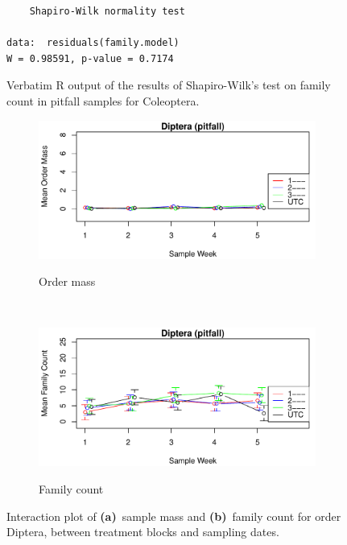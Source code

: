 \documentclass[10pt,letterpaper,twocolumn]{article}
\begin{document}
\begin{figure}[h]
	\lstset{numbers=left}
	\lstset{xleftmargin=5mm,framexleftmargin=5mm}
	\begin{lstlisting}
	Shapiro-Wilk normality test

data:  residuals(family.model)
W = 0.98591, p-value = 0.7174
	\end{lstlisting}
	\caption{Verbatim R output of the results of Shapiro-Wilk's test on family count in pitfall samples for Coleoptera.}
	\label{fig:pitfall_coleoptera_family_shapiro}
	\smallskip
	\nointerlineskip
	\hrulefill
\end{figure}

\begin{figure}[h]
	\centering
	\begin{subfigure}[b]{0.45\textwidth}
		\caption{Order mass}
		\includegraphics[width=\textwidth]{plots/blocks/interaction/mass/mass_pitfall_Diptera_interplot.pdf}
		\label{fig:pitfall_diptera_mass_interplot}
	\end{subfigure}
	~
	\begin{subfigure}[b]{0.45\textwidth}
		\caption{Family count}
		\includegraphics[width=\textwidth]{plots/blocks/interaction/family/family_pitfall_Diptera_interplot.pdf}
		\label{fig:pitfall_diptera_family_interplot}
	\end{subfigure}
	\caption{Interaction plot of \textbf{(a)}~sample mass and \textbf{(b)}~family count for order Diptera, between treatment blocks and sampling dates.}
	\label{fig:pitfall_diptera_interplot}
	\smallskip
	\nointerlineskip
	\hrulefill
\end{figure}
\end{document}
